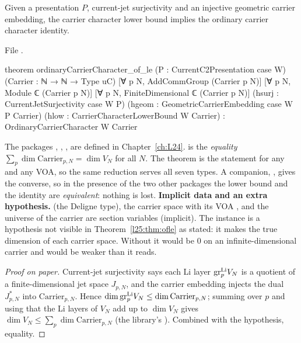 \begin{theorem}\label{l25:thm:ofle}
Given a presentation $P$, current-jet surjectivity and an injective geometric carrier embedding, the carrier
character lower bound implies the ordinary carrier character identity.
\end{theorem}
\noindent File .
\begin{leancode}
theorem ordinaryCarrierCharacter_of_le
    (P : CurrentC2Presentation case W)
    (Carrier : ℕ → ℕ → Type uC)
    [∀ p N, AddCommGroup (Carrier p N)]
    [∀ p N, Module ℂ (Carrier p N)]
    [∀ p N, FiniteDimensional ℂ (Carrier p N)]
    (hsurj : CurrentJetSurjectivity case W P)
    (hgeom : GeometricCarrierEmbedding case W P Carrier)
    (hlow : CarrierCharacterLowerBound W Carrier) :
    OrdinaryCarrierCharacter W Carrier
\end{leancode}
\begin{dictionary}
The packages , , ,
 are defined in Chapter~\ref{ch:L24}. 
is the \emph{equality} $\sum_p\dim\mathrm{Carrier}_{p,N}=\dim V_N$ for all $N$. The theorem is the
statement for any  and any VOA, so the same reduction serves all seven types. A companion,
, gives the converse, so in the presence of the two other
packages the lower bound and the identity are \emph{equivalent}: nothing is lost. \textbf{Implicit data and an
extra hypothesis.}  (the Deligne type), the carrier space  with
its VOA , and the universe  of the carrier are section variables (implicit). The instance
 is a hypothesis not visible in
Theorem~\ref{l25:thm:ofle} as stated: it makes  the true dimension of each carrier space. Without it
 would be $0$ on an infinite-dimensional carrier and  would be weaker than it reads.
\end{dictionary}
\begin{proof}[Proof on paper]
Current-jet surjectivity says each Li layer $\mathrm{gr}^{\rm Li}_{p}V_N$ is a quotient of a finite-dimensional
jet space $J_{p,N}$, and the carrier embedding injects the dual $J_{p,N}^*$ into $\mathrm{Carrier}_{p,N}$.
Hence $\dim\mathrm{gr}^{\rm Li}_pV_N\le\dim\mathrm{Carrier}_{p,N}$; summing over $p$ and using that the Li
layers of $V_N$ add up to $\dim V_N$ gives $\dim V_N\le\sum_p\dim\mathrm{Carrier}_{p,N}$ (the library's
). Combined with the hypothesis, equality.
\end{proof}
